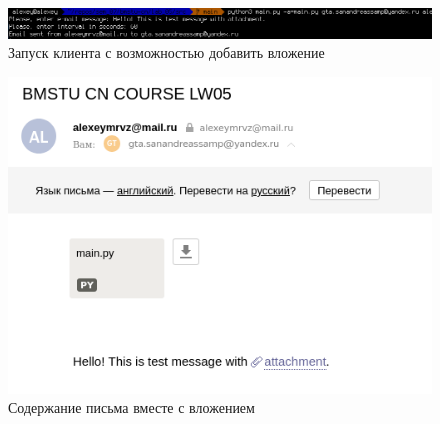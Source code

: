 \documentclass[12pt]{report}
\begin{document}
\begin{figure}[H]
	\begin{center}
		\includegraphics[scale=0.53]{img/4.png}
	\end{center}
	\caption{Запуск клиента с возможностью добавить вложение}
	\label{fig:example-attachment-mail}
\end{figure}

\begin{figure}[H]
	\begin{center}
		\includegraphics[scale=0.6]{img/5.png}
	\end{center}
	\caption{Содержание письма вместе с вложением}
	\label{fig:example-no-attachment-mail}
\end{figure}



	
\end{document}

